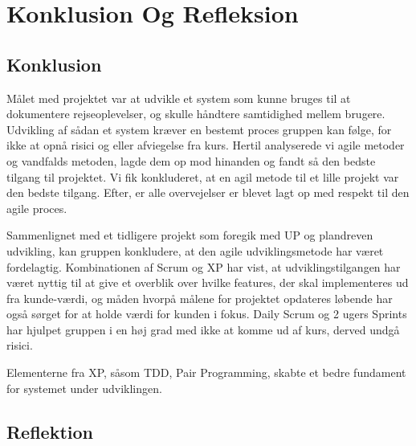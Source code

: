 \chapter{Konklusion Og Refleksion}\label{ch:KonklusionRefleksion}

\section{Konklusion}
Målet med projektet var at udvikle et system som kunne bruges til at dokumentere rejseoplevelser, og skulle håndtere samtidighed mellem brugere. Udvikling af sådan et system kræver en bestemt proces gruppen kan følge, for ikke at opnå risici og eller afviegelse fra kurs. Hertil analyserede vi agile metoder og vandfalds metoden, lagde dem op mod hinanden og fandt så den bedste tilgang til projektet. Vi fik konkluderet, at en agil metode til et lille projekt var den bedste tilgang. Efter, er alle overvejelser er blevet lagt op med respekt til den agile proces. 

 


Sammenlignet med et tidligere projekt som foregik med UP og plandreven udvikling, kan gruppen konkludere, at den agile udviklingsmetode har været fordelagtig. Kombinationen af Scrum og XP har vist, at udviklingstilgangen har været nyttig til at give et overblik over hvilke features, der skal implementeres ud fra kunde-værdi, og måden hvorpå målene for projektet opdateres løbende har også sørget for at holde værdi for kunden i fokus. Daily Scrum og 2 ugers Sprints har hjulpet gruppen i en høj grad med ikke at komme ud af kurs, derved undgå risici. 

Elementerne fra XP, såsom TDD, Pair Programming, skabte et bedre fundament for systemet under udviklingen.
 
 


\section{Reflektion}
